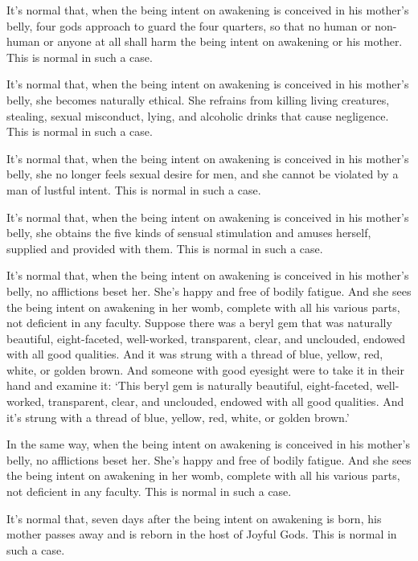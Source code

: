 \documentclass[12pt,openany]{book}%
\begin{document}
It’s normal that, when the being intent on awakening is conceived in his mother’s belly, four gods approach to guard the four quarters, so that no human or non-human or anyone at all shall harm the being intent on awakening or his mother. This is normal in such a case. 

It’s normal that, when the being intent on awakening is conceived in his mother’s belly, she becomes naturally ethical. She refrains from killing living creatures, stealing, sexual misconduct, lying, and alcoholic drinks that cause negligence. This is normal in such a case. 

It’s normal that, when the being intent on awakening is conceived in his mother’s belly, she no longer feels sexual desire for men, and she cannot be violated by a man of lustful intent. This is normal in such a case. 

It’s normal that, when the being intent on awakening is conceived in his mother’s belly, she obtains the five kinds of sensual stimulation and amuses herself, supplied and provided with them. This is normal in such a case. 

It’s normal that, when the being intent on awakening is conceived in his mother’s belly, no afflictions beset her. She’s happy and free of bodily fatigue. And she sees the being intent on awakening in her womb, complete with all his various parts, not deficient in any faculty. Suppose there was a beryl gem that was naturally beautiful, eight-faceted, well-worked, transparent, clear, and unclouded, endowed with all good qualities. And it was strung with a thread of blue, yellow, red, white, or golden brown. And someone with good eyesight were to take it in their hand and examine it: ‘This beryl gem is naturally beautiful, eight-faceted, well-worked, transparent, clear, and unclouded, endowed with all good qualities. And it’s strung with a thread of blue, yellow, red, white, or golden brown.’ 

In the same way, when the being intent on awakening is conceived in his mother’s belly, no afflictions beset her. She’s happy and free of bodily fatigue. And she sees the being intent on awakening in her womb, complete with all his various parts, not deficient in any faculty. This is normal in such a case. 

It’s normal that, seven days after the being intent on awakening is born, his mother passes away and is reborn in the host of Joyful Gods. This is normal in such a case. 
\end{document}
